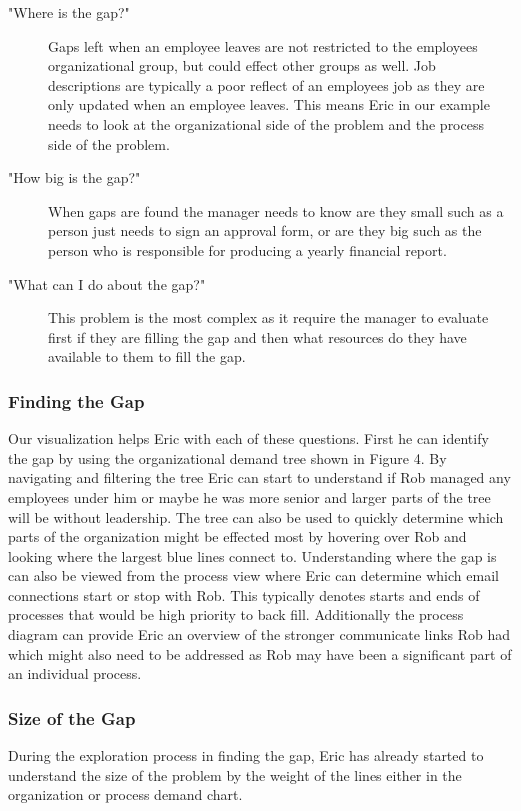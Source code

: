 \documentclass[journal]{vgtc}                %
\begin{document}
\begin{description}
	\item ["Where is the gap?"] Gaps left when an employee leaves are not restricted to the employees organizational group, but could effect other groups as well.  Job descriptions are typically a poor reflect of an employees job as they are only updated when an employee leaves.  This means Eric in our example needs to look at the organizational side of the problem and the process side of the problem.
	\item ["How big is the gap?"] When gaps are found the manager needs to know are they small such as a person just needs to sign an approval form, or are they big such as the person who is responsible for producing a yearly financial report.
	\item ["What can I do about the gap?"] This problem is the most complex as it require the manager to evaluate first if they are filling the gap and then what resources do they have available to them to fill the gap.
\end{description}

\subsubsection{Finding the Gap}
Our visualization helps Eric with each of these questions.  First he can identify the gap by using the organizational demand tree shown in Figure 4.  By navigating and filtering the tree Eric can start to understand if Rob managed any employees under him or maybe he was more senior and larger parts of the tree will be without leadership.  The tree can also be used to quickly determine which parts of the organization might be effected most by hovering over Rob and looking where the largest blue lines connect to.
Understanding where the gap is can also be viewed from the process view where Eric can determine which email connections start or stop with Rob.  This typically denotes starts and ends of processes that would be high priority to back fill.  Additionally the process diagram can provide Eric an overview of the stronger communicate links Rob had which might also need to be addressed as Rob may have been a significant part of an individual process.

\subsubsection{Size of the Gap}
During the exploration process in finding the gap, Eric has already started to understand the size of the problem by the weight of the lines either in the organization or process demand chart.
\end{document}
